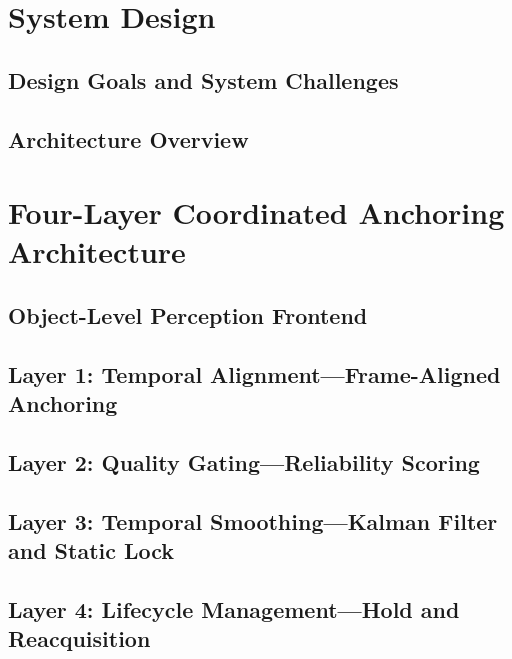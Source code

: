 \documentclass[review]{vgtc}
\begin{document}
\section{System Design}

\subsection{Design Goals and System Challenges}

\subsection{Architecture Overview}

\section{Four-Layer Coordinated Anchoring Architecture}

\subsection{Object-Level Perception Frontend}

\subsection{Layer 1: Temporal Alignment---Frame-Aligned Anchoring}

\subsection{Layer 2: Quality Gating---Reliability Scoring}

\subsection{Layer 3: Temporal Smoothing---Kalman Filter and Static Lock}

\subsection{Layer 4: Lifecycle Management---Hold and Reacquisition}
\end{document}
